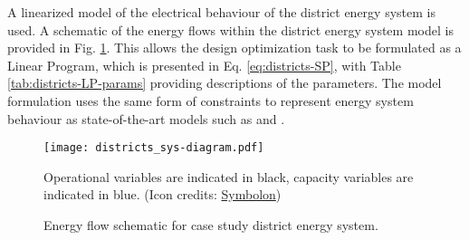 A linearized model of the electrical behaviour of the district energy system is used. A schematic of the energy flows within the district energy system model is provided in Fig. \ref{fig:districts-energy-system}. This allows the design optimization task to be formulated as a Linear Program, which is presented in Eq. \ref{eq:districts-SP}, with Table \ref{tab:districts-LP-params} providing descriptions of the parameters. The model formulation uses the same form of constraints to represent energy system behaviour as state-of-the-art models such as \citep{pfenninger2018CalliopeMultiscaleEnergy} and \citep{brown2018PyPSAPythonPower}.\\

\begin{figure}[h]
    \centering
    \texttt{[image: districts\_sys-diagram.pdf]}
    \caption{Energy flow schematic for case study district energy system.}
    {\scriptsize Operational variables are indicated in black, capacity variables are indicated in blue. (Icon credits: \href{https://thenounproject.com/symbolon/}{Symbolon})}
    \label{fig:districts-energy-system}
\end{figure}

